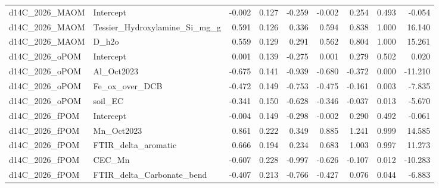 \documentclass[preprint,12pt]{elsarticle}
\begin{document}
\begin{landscape}
\begin{longtable}{llrrrrrrr}
d14C\_2026\_MAOM & Intercept & -0.002 & 0.127 & -0.259 & -0.002 & 0.254 & 0.493 & -0.054 \\
d14C\_2026\_MAOM & Tessier\_Hydroxylamine\_Si\_mg\_g & 0.591 & 0.126 & 0.336 & 0.594 & 0.838 & 1.000 & 16.140 \\
d14C\_2026\_MAOM & D\_h2o & 0.559 & 0.129 & 0.291 & 0.562 & 0.804 & 1.000 & 15.261 \\
d14C\_2026\_oPOM & Intercept & 0.001 & 0.139 & -0.275 & 0.001 & 0.279 & 0.502 & 0.020 \\
d14C\_2026\_oPOM & Al\_Oct2023 & -0.675 & 0.141 & -0.939 & -0.680 & -0.372 & 0.000 & -11.210 \\
d14C\_2026\_oPOM & Fe\_ox\_over\_DCB & -0.472 & 0.149 & -0.753 & -0.475 & -0.161 & 0.003 & -7.835 \\
d14C\_2026\_oPOM & soil\_EC & -0.341 & 0.150 & -0.628 & -0.346 & -0.037 & 0.013 & -5.670 \\
d14C\_2026\_fPOM & Intercept & -0.004 & 0.149 & -0.298 & -0.002 & 0.290 & 0.492 & -0.061 \\
d14C\_2026\_fPOM & Mn\_Oct2023 & 0.861 & 0.222 & 0.349 & 0.885 & 1.241 & 0.999 & 14.585 \\
d14C\_2026\_fPOM & FTIR\_delta\_aromatic & 0.666 & 0.194 & 0.234 & 0.683 & 1.003 & 0.997 & 11.273 \\
d14C\_2026\_fPOM & CEC\_Mn & -0.607 & 0.228 & -0.997 & -0.626 & -0.107 & 0.012 & -10.283 \\
d14C\_2026\_fPOM & FTIR\_delta\_Carbonate\_bend & -0.407 & 0.213 & -0.766 & -0.427 & 0.076 & 0.044 & -6.883 \\
\end{longtable}

\newpage


\end{landscape}
\end{document}
